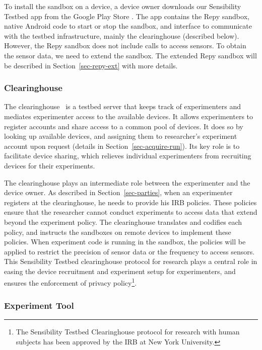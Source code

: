 To install the sandbox on a device, a device owner downloads 
our Sensibility Testbed app from the Google Play Store \cite{sensibility-app}.
The app contains the Repy sandbox, native Android code to 
start or stop the sandbox, and interface to communicate with the testbed 
infrastructure, mainly the clearinghouse (described below). 
However, the Repy sandbox does not include calls to access sensors. 
To obtain the sensor data, we need to extend the sandbox. 
The extended Repy sandbox will be described in Section~\ref{sec-repy-ext}
with more details.

\subsubsection{Clearinghouse}\label{sec-ch}
The clearinghouse~\cite{ch} is a testbed server that keeps track of 
experimenters and mediates experimenter access to the 
available devices. It allows experimenters to register 
accounts and share access to a common pool of devices.
It does so by looking up available devices, and assigning
them to researcher's experiment account upon request 
(details in Section~\ref{sec-acquire-run}). 
Its key role is to facilitate device sharing, 
which relieves individual experimenters from recruiting 
devices for their experiments.

The clearinghouse
plays an intermediate role between the experimenter and 
the device owner.
As described in Section~\ref{sec-parties}, when an 
experimenter registers at the clearinghouse, he
needs to provide his IRB policies. These policies ensure that
the researcher cannot conduct experiments to access data that
extend beyond the experiment policy. The clearinghouse 
translates and codifies each policy, and instructs the 
sandboxes on remote devices to implement these policies. 
When experiment code is running in the sandbox, the 
policies will be applied to restrict the precision of sensor 
data or the frequency to access sensors. This Sensibility Testbed
clearinghouse protocol for research plays a central role in
easing the device recruitment and experiment setup for experimenters, 
and ensures the enforcement
of privacy policy\footnote{The Sensibility Testbed Clearinghouse
protocol for research with human subjects has been approved by
the IRB at New York University. }. 

\subsubsection{Experiment Tool}\label{sec-emt}

